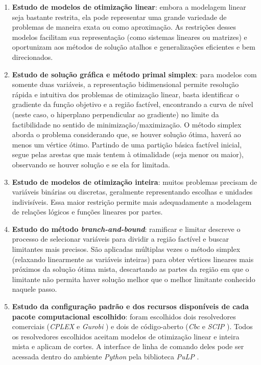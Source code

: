 \documentclass[]{article}
\newcommand{ \solver }[1]{\textit{#1}}
\newcommand{ \python }[1]{\textit{#1}}
\begin{document}
		\begin{enumerate}
			
			\item \textbf{Estudo de modelos de otimização linear}:
				embora a modelagem linear seja bastante restrita, ela pode representar uma grande variedade de problemas de maneira exata ou como aproximação. 
				As restrições desses modelos facilitam sua representação (como sistemas lineares ou matrizes) e oportunizam aos métodos de solução atalhos e generalizações eficientes e bem direcionados.
				
			\item \textbf{Estudo de solução gráfica e método primal simplex}:
				para modelos com somente duas variáveis, a representação bidimensional permite resolução rápida e intuitiva dos problemas de otimização linear, basta identificar o gradiente da função objetivo e a região factível, encontrando a curva de nível (neste caso, o hiperplano perpendicular ao gradiente) no limite da factibilidade no sentido de minimização/maximização. 
				O método simplex aborda o problema considerando que, se houver solução ótima, haverá ao menos um vértice ótimo. Partindo de uma partição básica factível inicial, segue pelas arestas que mais tentem à otimalidade (seja menor ou maior), observando se houver solução e se ela for limitada. 
				
			\item \textbf{Estudo de modelos de otimização inteira}:
				muitos problemas precisam de variáveis binárias ou discretas, geralmente representando escolhas e unidades indivisíveis. 
				Essa maior restrição permite mais adequadamente a modelagem de relações lógicos e funções lineares por partes. 
				
			\item \textbf{Estudo do método \textit{branch-and-bound}}:
				ramificar e limitar descreve o processo de selecionar variáveis para dividir a região factível e buscar limitantes mais precisos.
				São aplicadas múltiplas vezes o método simplex (relaxando linearmente as variáveis inteiras) para obter vértices lineares mais próximos da solução ótima mista, descartando as partes da região em que o limitante não permita haver solução melhor que o melhor limitante conhecido naquele passo.
				
			\item \textbf{Estudo da configuração padrão e dos recursos disponíveis de cada pacote computacional escolhido}: 
				foram escolhidos dois resolvedores comerciais (\solver{CPLEX} \cite{CPLEX} e \solver{Gurobi} \cite{Gurobi}) e dois de código-aberto (\solver{Cbc} \cite{Cbc} e \solver{SCIP} \cite{SCIP}).
				Todos os resolvedores escolhidos aceitam modelos de otimização linear e inteira mista e aplicam de cortes. 
				A interface de linha de comando deles pode ser acessada dentro do ambiente \python{Python} \cite{Python} pela biblioteca \python{PuLP} \cite{PuLP}.
				

\end{enumerate}
\end{document}
